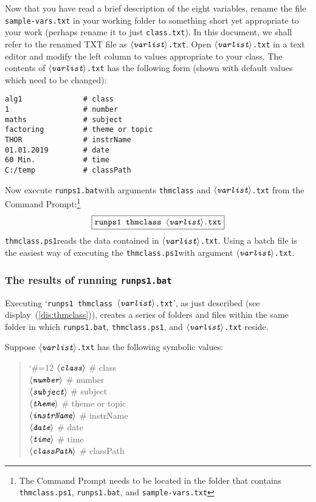 \documentclass{article}
\let\tops\texorpdfstring
\let\uif\textsf
\def\thescript{\texttt{thmclass.ps1}}
\def\thebatch{\texttt{runps1.bat}}
\def\ameta#1{\ensuremath{\langle\textit{\texttt{#1}}\rangle}}
\begin{document}
Now that you have read a brief description of the eight variables, rename the
file \texttt{sample-vars.txt} in your working folder to something short yet
appropriate to your work (perhaps rename it to just \texttt{class.txt}). In
this document, we shall refer to the renamed TXT file as
\texttt{\ameta{varlist}.txt}. Open \texttt{\ameta{varlist}.txt} in a text
editor and modify the left column to values appropriate to your class. The
contents of \ameta{varlist}\texttt{.txt} has the following form (shown with
default values which need to be changed):
\begin{Verbatim}[xleftmargin=\parindent]
alg1              # class
1                 # number
maths             # subject
factoring         # theme or topic
THOR              # instrName
01.01.2019        # date
60 Min.           # time
C:/temp           # classPath
\end{Verbatim}
Now execute \thebatch\space with arguments \texttt{thmclass} and
\texttt{\ameta{varlist}.txt} from the \uif{Command Prompt}:\footnote{The \uif{Command Prompt} needs
to be located in the folder that contains  \thescript, \thebatch, and \texttt{sample-vars.txt}}
\begin{equation}
  \fbox{\ttfamily runps1 thmclass \ameta{varlist}\texttt{.txt}}\label{dis:thmclass}
\end{equation}
\thescript\space reads the data contained in
\ameta{varlist}\texttt{.txt}. Using a batch file is the easiest way of executing the
\thescript\space with argument \texttt{\ameta{varlist}.txt}.

\subsubsection{The results of running \tops{\thebatch}{runps1.bat}}

Executing `\texttt{runps1 thmclass \ameta{varlist}.txt}', as
just described (see display~(\ref{dis:thmclass})), creates a
series of folders and files within the same folder in which
{\thebatch}, {\thescript}, and \texttt{\ameta{varlist}.txt}
reside.\medskip

Suppose \texttt{\ameta{varlist}.txt} has the following symbolic
values:
\begin{quote}\ttfamily\obeyspaces\catcode`\#=12
\ameta{class}     # class\\
\ameta{number}    # number\\
\ameta{subject}   # subject\\
\ameta{theme}     # theme or topic\\
\ameta{instrName} # instrName\\
\ameta{date}      # date\\
\ameta{time}      # time\\
\ameta{classPath} # classPath
\end{quote}
\end{document}
